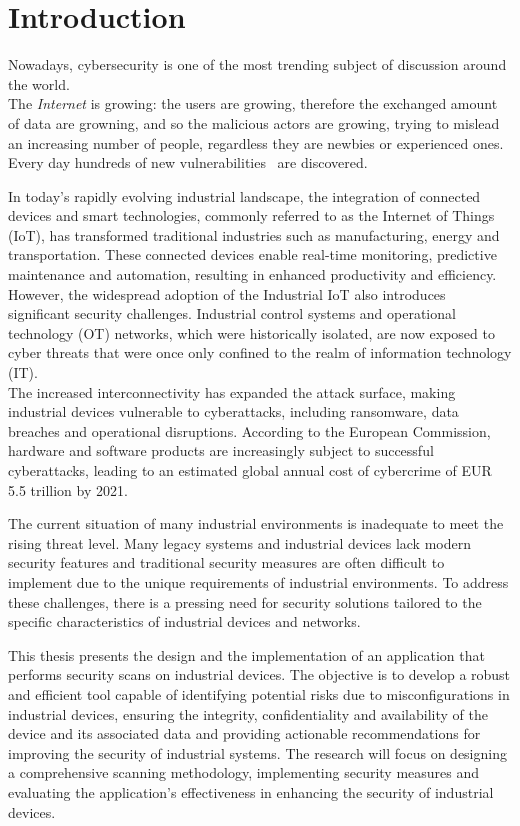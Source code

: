 \chapter{Introduction}
\label{cha:intro}

Nowadays, cybersecurity is one of the most trending subject of discussion around the world.~\cite{trends-computer-science}\\

The \textit{Internet} is growing: the users are growing, therefore the exchanged amount of data are growning, and so the malicious actors are growing, trying to mislead an increasing number of people, regardless they are newbies or experienced ones. Every day hundreds of new vulnerabilities~\cite{cve-details-db} are discovered.

In today's rapidly evolving industrial landscape, the integration of connected devices and smart technologies, commonly referred to as the Internet of Things (IoT), has transformed traditional industries such as manufacturing, energy and transportation. These connected devices enable real-time monitoring, predictive maintenance and automation, resulting in enhanced productivity and efficiency. \\
However, the widespread adoption of the Industrial IoT also introduces significant security challenges. Industrial control systems and operational technology (OT) networks, which were historically isolated, are now exposed to cyber threats that were once only confined to the realm of information technology (IT). \\
The increased interconnectivity has expanded the attack surface, making industrial devices vulnerable to cyberattacks, including ransomware, data breaches and operational disruptions. According to the European Commission, hardware and software products are increasingly subject to successful cyberattacks, leading to an estimated global annual cost of cybercrime of EUR 5.5 trillion by 2021.~\cite{cra-eu}

The current situation of many industrial environments is inadequate to meet the rising threat level. Many legacy systems and industrial devices lack modern security features and traditional security measures are often difficult to implement due to the unique requirements of industrial environments. To address these challenges, there is a pressing need for security solutions tailored to the specific characteristics of industrial devices and networks.

This thesis presents the design and the implementation of an application that performs security scans on industrial devices. The objective is to develop a robust and efficient tool capable of identifying potential risks due to misconfigurations in industrial devices, ensuring the integrity, confidentiality and availability of the device and its associated data and providing actionable recommendations for improving the security of industrial systems. The research will focus on designing a comprehensive scanning methodology, implementing security measures and evaluating the application's effectiveness in enhancing the security of industrial devices.

